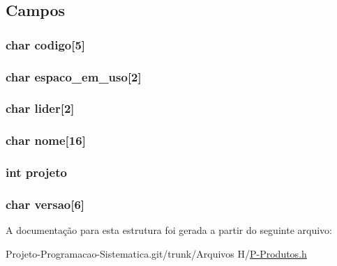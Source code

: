 \subsection{Campos}
\hypertarget{structproduto_ad0c9d37982e1e28e99d46e4b61873b2b}{
\subsubsection[{codigo}]{\setlength{\rightskip}{0pt plus 5cm}char codigo\mbox{[}5\mbox{]}}}\label{structproduto_ad0c9d37982e1e28e99d46e4b61873b2b}
\hypertarget{structproduto_ac7e43414b526549a2b1e10ea21cf75de}{
\subsubsection[{espaco\-\_\-em\-\_\-uso}]{\setlength{\rightskip}{0pt plus 5cm}char espaco\-\_\-em\-\_\-uso\mbox{[}2\mbox{]}}}\label{structproduto_ac7e43414b526549a2b1e10ea21cf75de}
\hypertarget{structproduto_adfe3d53145a1dbc68bc34d864d25ba37}{
\subsubsection[{lider}]{\setlength{\rightskip}{0pt plus 5cm}char lider\mbox{[}2\mbox{]}}}\label{structproduto_adfe3d53145a1dbc68bc34d864d25ba37}
\hypertarget{structproduto_a25aba59e5c950d7fdadfdb8b5f7f861d}{
\subsubsection[{nome}]{\setlength{\rightskip}{0pt plus 5cm}char nome\mbox{[}16\mbox{]}}}\label{structproduto_a25aba59e5c950d7fdadfdb8b5f7f861d}
\hypertarget{structproduto_a9d906bed8fe7bf344c38918cc554a5fe}{
\subsubsection[{projeto}]{\setlength{\rightskip}{0pt plus 5cm}int projeto}}\label{structproduto_a9d906bed8fe7bf344c38918cc554a5fe}
\hypertarget{structproduto_a376e2786bc5a3760798074dd795d03a3}{
\subsubsection[{versao}]{\setlength{\rightskip}{0pt plus 5cm}char versao\mbox{[}6\mbox{]}}}\label{structproduto_a376e2786bc5a3760798074dd795d03a3}


A documentação para esta estrutura foi gerada a partir do seguinte arquivo\-:\begin{DoxyCompactItemize}
\item 
Projeto-\/\-Programacao-\/\-Sistematica.\-git/trunk/\-Arquivos H/\hyperlink{_p-_produtos_8h}{P-\/\-Produtos.\-h}\end{DoxyCompactItemize}
